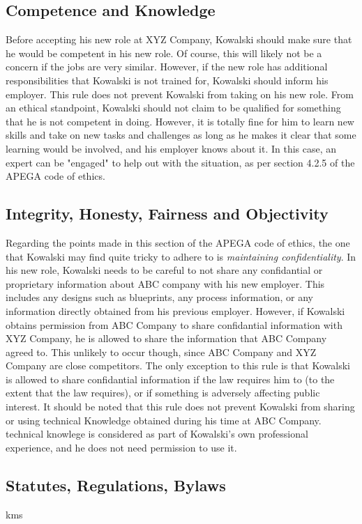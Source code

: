 \documentclass[letterpaper,12pt]{article}
\begin{document}
\subsection{Competence and Knowledge}
Before accepting his new role at XYZ Company, Kowalski should make sure that he would be competent in his new role.
Of course, this will likely not be a concern if the jobs are very similar. However, if the new role has additional responsibilities that Kowalski
is not trained for, Kowalski should inform his employer. This rule does not prevent Kowalski from taking on his new role. From an ethical standpoint,
Kowalski should not claim to be qualified for something that he is not competent in doing. However, it is totally fine for him to learn new skills and take on
new tasks and challenges as long as he makes it clear that some learning would be involved, and his employer knows about it. In this case, an expert can be "engaged"
to help out with the situation, as per section 4.2.5 of the APEGA code of ethics.\cite{apegacode}

\subsection{Integrity, Honesty, Fairness and Objectivity}
Regarding the points made in this section of the APEGA code of ethics, the one that Kowalski may find quite tricky to
adhere to is \textit{maintaining confidentiality}. In his new role, Kowalski needs to be careful to not share
any confidantial or proprietary information about ABC company with his new employer. This includes any designs such as blueprints,
any process information, or any information directly obtained from his previous employer. However, if Kowalski obtains permission from ABC Company to share
confidantial information with XYZ Company, he is allowed to share the information that ABC Company agreed to. This unlikely to occur though,
since ABC Company and XYZ Company are close competitors. The only exception to this rule is that Kowalski is allowed to share confidantial information 
if the law requires him to (to the extent that the law requires), or if something is adversely affecting public interest. It should be noted that this
rule does not prevent Kowalski from sharing or using technical Knowledge obtained during his time at ABC Company. technical knowlege is considered as part of
Kowalski's own professional experience, and he does not need permission to use it. 

\subsection{Statutes, Regulations, Bylaws}
kms
\end{document}
